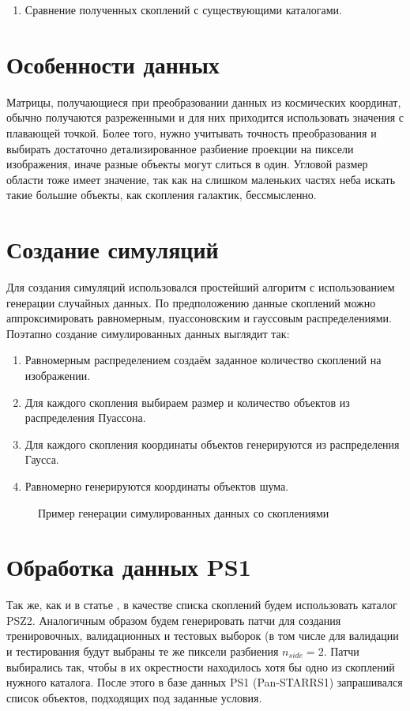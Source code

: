 \begin{enumerate}
    \item Сравнение полученных скоплений с существующими каталогами.
\end{enumerate}

\section{Особенности данных}
Матрицы, получающиеся при преобразовании данных из космических 
координат, обычно получаются разреженными и для них приходится использовать значения с плавающей 
точкой. Более того, нужно учитывать точность преобразования и выбирать достаточно детализированное 
разбиение проекции на пиксели изображения, иначе разные объекты могут слиться в один. Угловой 
размер области тоже имеет значение, так как на слишком маленьких частях неба искать такие большие 
объекты, как скопления галактик, бессмысленно.\\


\section{Создание симуляций}
Для создания симуляций использовался простейший алгоритм с использованием генерации случайных 
данных. По предположению данные скоплений можно аппроксимировать равномерным, пуассоновским и 
гауссовым распределениями.
Поэтапно создание симулированных данных выглядит так:

\begin{enumerate}
	\item Равномерным распределением создаём заданное количество скоплений на изображении.
	\item Для каждого скопления выбираем размер и количество объектов из распределения Пуассона.
	\item Для каждого скопления координаты объектов генерируются из распределения Гаусса.
	\item Равномерно генерируются координаты объектов шума.
\end{enumerate}

\begin{figure}[h]
    \caption{Пример генерации симулированных данных со скоплениями}
\end{figure}


\section{Обработка данных PS1}
Так же, как и в статье \cite{Bonjean}, в качестве списка скоплений будем использовать каталог PSZ2. 
Аналогичным образом будем генерировать патчи для создания тренировочных, валидационных и тестовых 
выборок (в том числе для валидации и тестирования будут выбраны те же пиксели разбиения $n_{side}=2$. 
Патчи выбирались так, чтобы в их окрестности находилось хотя бы одно из скоплений нужного каталога. 
После этого в базе данных PS1 (Pan-STARRS1) запрашивался список объектов, подходящих под заданные 
условия. \\

